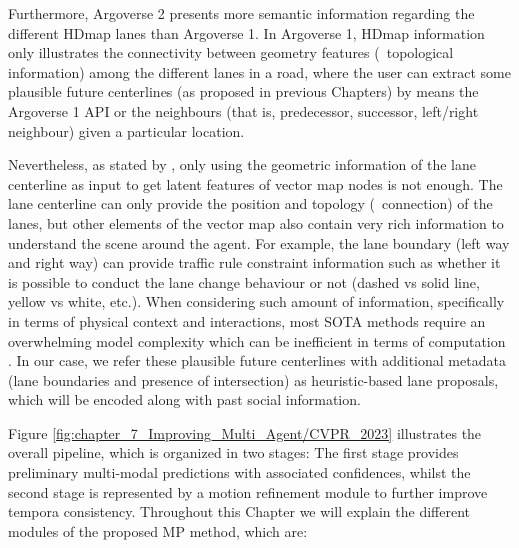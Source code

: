 Furthermore, Argoverse 2 presents more semantic information regarding the different \ac{HDmap} lanes than Argoverse 1. In Argoverse 1, \ac{HDmap} information only illustrates the connectivity between geometry features (\ie \ topological information) among the different lanes in a road, where the user can extract some plausible future centerlines (as proposed in previous Chapters) by means the Argoverse 1 \ac{API} or the neighbours (that is, predecessor, successor, left/right neighbour) given a particular location. 

Nevertheless, as stated by \cite{zhang2022banet}, only using the geometric information of the lane centerline as input to get latent features of vector map nodes is not enough. The lane centerline can only provide the position and topology (\ie \ connection) of the lanes, but other elements of the vector map also contain very rich information to understand the scene around the agent. For example, the lane boundary (left way and right way) can provide traffic rule constraint information such as whether it is possible to conduct the lane change behaviour or not (dashed vs solid line, yellow vs white, etc.). When considering such amount of information, specifically in terms of physical context and interactions, most \ac{SOTA} methods require an overwhelming model complexity which can be inefficient in terms of computation \cite{gao2020vectornet, walters2020trajectory, can2022maps}. In our case, we refer these plausible future centerlines with additional metadata (lane boundaries and presence of intersection) as heuristic-based lane proposals, which will be encoded along with past social information.

Figure \ref{fig:chapter_7_Improving_Multi_Agent/CVPR_2023} illustrates the overall pipeline, which is organized in two stages: The first stage provides preliminary multi-modal predictions with associated confidences, whilst the second stage is represented by a motion refinement module to further improve tempora consistency. Throughout this Chapter we will explain the different modules of the proposed \ac{MP} method, which are:

